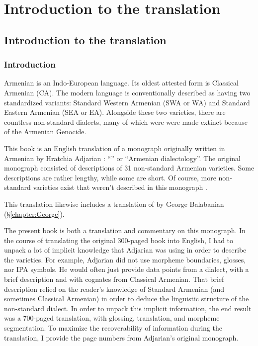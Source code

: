 \part{Introduction to the translation}




\chapter{Introduction to the translation}\label{chapter:HossepIntro}


\section{Introduction}

 

Armenian is an Indo-European language. Its oldest attested form is Classical Armenian (CA). The modern language is conventionally described as having two standardized variants: Standard Western Armenian (SWA or WA) and Standard Eastern Armenian (SEA or EA). Alongside these two varieties, there are countless non-standard dialects, many of which were were made extinct because of the Armenian Genocide. 

This book is an English translation of a monograph originally written in Armenian by Hratchia Adjarian \citep{Adjarian-1911-DialectologyBook}: ``'' or ``Armenian dialectology''. The original monograph consisted of descriptions of 31 non-standard Armenian varieties. Some descriptions are rather lengthy, while some are short.  Of course, more non-standard varieties exist that weren't described in this monograph  \citep{GreppinKhachaturian-1986-HandbookArmenianDialectology,Martirosyan-2019-Armeniandialects,Martirosyan-2019-ArmenianDialectsBigVersionRussianJournal,DolatianEtAl-prep-IranianGrammar}.

This translation likewise includes a translation of \citet{Adjarian-1899-ArmenianExplosives} by George Balabanian (\S\ref{chapter:George}). 


The present book is both a translation and commentary on this monograph. In the course of translating the original 300-paged book into English, I had to unpack a lot of implicit knowledge that Adjarian was using in order to describe the varieties. For example, Adjarian did not use morpheme boundaries, glosses, nor IPA symbols. He would often just provide data points from a dialect, with a brief  description and with cognates from Classical Armenian. That brief description relied on the reader's knowledge of Standard Armenian (and sometimes Classical Armenian) in order to deduce the linguistic structure of the non-standard dialect. In order to unpack this implicit information, the end result was a 700-paged translation, with glossing, translation, and morpheme segmentation. To maximize the recoverability of information during the translation, I provide the page numbers from Adjarian's original monograph. 

